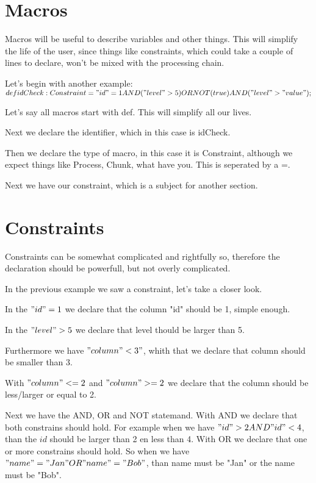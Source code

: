 \documentclass[a4paper]{article}
\begin{document}
\section{Macros}
Macros will be useful to describe variables and other things. This will simplify the life of the user, since things like constraints, which could take a couple of lines to declare, won't be mixed with the processing chain.

Let's begin with another example: \\

$def idCheck : Constraint = "id" = 1 AND ("level" > 5) OR NOT(true) AND ("level" > "value");$

Let's say all macros start with def. This will simplify all our lives.

Next we declare the identifier, which in this case is idCheck.

Then we declare the type of macro, in this case it is Constraint, although we expect things like Process, Chunk, what have you. This is seperated by a =.

Next we have our constraint, which is a subject for another section.

\section{Constraints}
Constraints can be somewhat complicated and rightfully so, therefore the declaration should be powerfull, but not overly complicated.

In the previous example we saw a constraint, let's take a closer look.

In the $"id" = 1$ we declare that the column "id" should be 1, simple enough. 

In the $"level" > 5$ we declare that level thould be larger than 5. 

Furthermore we have $"column" < 3"$, whith that we declare that column should be smaller than 3.

With $"column" <= 2$ and $"column" >= 2$ we declare that the column should be less/larger or equal to 2.

Next we have the AND, OR and NOT statemand. With AND we declare that both constrains should hold. For example when we have $"id" > 2 AND "id" < 4$, than the $id$ should be larger than 2 en less than 4.
With OR we declare that one or more constrains should hold. So when we have $"name" = "Jan" OR "name" = "Bob"$, than name must be "Jan" or the name must be "Bob".
\end{document}
